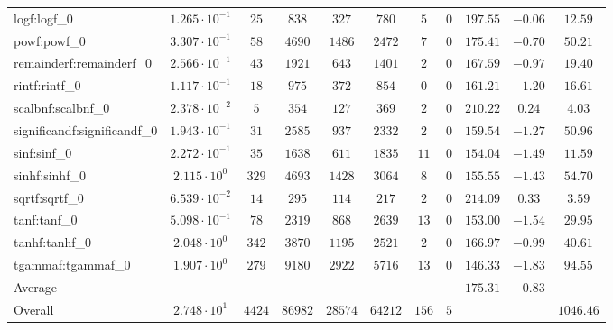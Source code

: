 \begin{tabular}{|l|c|c|c|c|c|c|c|c|c|c|}
logf:logf\_0                 & $ 1.265 \cdot 10^{-1} $ & $ 25     $ & $ 838   $ & $ 327   $ & $ 780   $ & $ 5   $ & $ 0 $ & $ 197.55      $ & $ -0.06   $ & $ 12.59   $ \\
powf:powf\_0                 & $ 3.307 \cdot 10^{-1} $ & $ 58     $ & $ 4690  $ & $ 1486  $ & $ 2472  $ & $ 7   $ & $ 0 $ & $ 175.41      $ & $ -0.70   $ & $ 50.21   $ \\
remainderf:remainderf\_0     & $ 2.566 \cdot 10^{-1} $ & $ 43     $ & $ 1921  $ & $ 643   $ & $ 1401  $ & $ 2   $ & $ 0 $ & $ 167.59      $ & $ -0.97   $ & $ 19.40   $ \\
rintf:rintf\_0               & $ 1.117 \cdot 10^{-1} $ & $ 18     $ & $ 975   $ & $ 372   $ & $ 854   $ & $ 0   $ & $ 0 $ & $ 161.21      $ & $ -1.20   $ & $ 16.61   $ \\
scalbnf:scalbnf\_0           & $ 2.378 \cdot 10^{-2} $ & $ 5      $ & $ 354   $ & $ 127   $ & $ 369   $ & $ 2   $ & $ 0 $ & $ 210.22      $ & $ 0.24    $ & $ 4.03    $ \\
significandf:significandf\_0 & $ 1.943 \cdot 10^{-1} $ & $ 31     $ & $ 2585  $ & $ 937   $ & $ 2332  $ & $ 2   $ & $ 0 $ & $ 159.54      $ & $ -1.27   $ & $ 50.96   $ \\
sinf:sinf\_0                 & $ 2.272 \cdot 10^{-1} $ & $ 35     $ & $ 1638  $ & $ 611   $ & $ 1835  $ & $ 11  $ & $ 0 $ & $ 154.04      $ & $ -1.49   $ & $ 11.59   $ \\
sinhf:sinhf\_0               & $ 2.115 \cdot 10^{0}  $ & $ 329    $ & $ 4693  $ & $ 1428  $ & $ 3064  $ & $ 8   $ & $ 0 $ & $ 155.55      $ & $ -1.43   $ & $ 54.70   $ \\
sqrtf:sqrtf\_0               & $ 6.539 \cdot 10^{-2} $ & $ 14     $ & $ 295   $ & $ 114   $ & $ 217   $ & $ 2   $ & $ 0 $ & $ 214.09      $ & $ 0.33    $ & $ 3.59    $ \\
tanf:tanf\_0                 & $ 5.098 \cdot 10^{-1} $ & $ 78     $ & $ 2319  $ & $ 868   $ & $ 2639  $ & $ 13  $ & $ 0 $ & $ 153.00      $ & $ -1.54   $ & $ 29.95   $ \\
tanhf:tanhf\_0               & $ 2.048 \cdot 10^{0}  $ & $ 342    $ & $ 3870  $ & $ 1195  $ & $ 2521  $ & $ 2   $ & $ 0 $ & $ 166.97      $ & $ -0.99   $ & $ 40.61   $ \\
tgammaf:tgammaf\_0           & $ 1.907 \cdot 10^{0}  $ & $ 279    $ & $ 9180  $ & $ 2922  $ & $ 5716  $ & $ 13  $ & $ 0 $ & $ 146.33      $ & $ -1.83   $ & $ 94.55   $ \\
\hline
Average                      & $                     $ & $        $ & $       $ & $       $ & $       $ & $     $ & $   $ & $ 175.31      $ & $ -0.83   $ & $         $ \\
\hline
Overall                      & $ 2.748 \cdot 10^{1}  $ & $ 4424   $ & $ 86982 $ & $ 28574 $ & $ 64212 $ & $ 156 $ & $ 5 $ & $             $ & $         $ & $ 1046.46 $ \\
\hline
\end{tabular}

